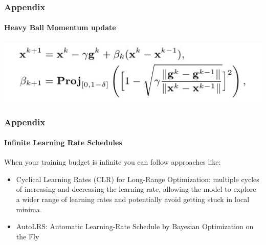\documentclass[10pt,aspectratio=169]{beamer}
\begin{document}
    \begin{frame}
        \frametitle{Appendix}
        \framesubtitle{Heavy Ball Momentum update}
        \includegraphics{graphics/heavy_ball_momentum_update.jpg}
    \end{frame}


    \begin{frame}
        \frametitle{Appendix}
        \framesubtitle{Infinite Learning Rate Schedules}
        When your training budget is infinite you can follow approaches like:
        \begin{itemize}
            \item Cyclical Learning Rates (CLR) for Long-Range Optimization: multiple cycles of increasing and decreasing the learning rate, allowing the model to explore a wider range of learning rates and potentially avoid getting stuck in local minima.
            \item AutoLRS: Automatic Learning-Rate Schedule by Bayesian Optimization on the Fly \cite{jin2021autolrs}
        \end{itemize}
    \end{frame}
    \blackslide
    
\end{document}
